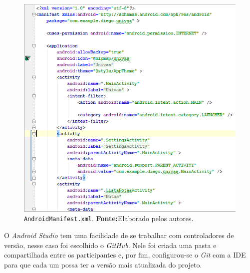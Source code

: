	\begin{figure}[h!]
			\centerline{\includegraphics[scale=0.4]{./imagens/2_q_metodologico/qm8.png}}
			\caption[\texttt{AndroidManifest.xml}]{\texttt{AndroidManifest.xml}.
			 \textbf{Fonte:}Elaborado pelos autores.}
			\label{fig:qm8}
		\end{figure}
		\pagebreak

	\par O \textit{Android Studio} tem uma facilidade de se trabalhar com
controladores de versão, nesse caso foi escolhido o \textit{GitHub}. Nele foi
criada uma pasta e compartilhada entre os participantes e, por fim,
configurou-se o \textit{Git} com a IDE para que cada um possa ter a versão mais
atualizada do projeto.